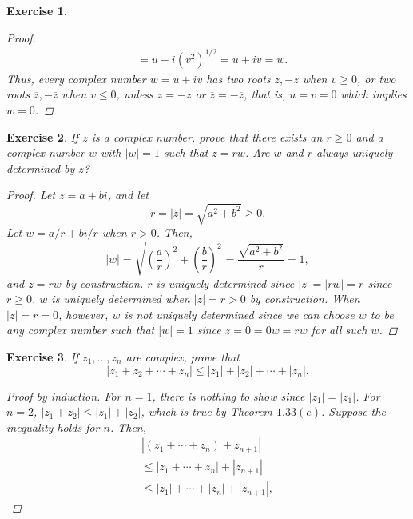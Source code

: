 \documentclass[10pt,letterpaper]{amsart}
\newtheorem{exercise}{Exercise}[section]
\theoremstyle{definition}
\theoremstyle{remark}
\numberwithin{equation}{exercise}
\begin{document}
\begin{multicols}{2}
\begin{exercise}
\begin{proof}
\begin{align*}
        &= u - i\left( v^2 \right)^{1/2} = u + iv = w.
      \end{align*}
      Thus, every complex number $w = u + iv$ has two roots $z,-z$ when $v \ge 0$, or two roots $\overline{z},-\overline{z}$ when $v \le 0$, unless $z = -z$ or $\overline{z} = -\overline{z}$, that is, $u = v = 0$ which implies $w = 0$.
    \end{proof}
  \end{exercise}
  \begin{exercise}\label{1.11}
    If $z$ is a complex number, prove that there exists an $r \ge 0$ and a complex number $w$ with $|w| = 1$ such that $z = rw$. Are $w$ and $r$ always uniquely determined by $z$?
    \begin{proof}
      Let $z = a + bi$, and let
      \begin{equation*}
        r = |z| = \sqrt{a^2 + b^2} \ge 0.
      \end{equation*}
      Let $w = a/r + bi/r$ when $r > 0$. Then,
      \begin{equation*}
        |w| = \sqrt{\left(\frac{a}{r}\right)^2+\left(\frac{b}{r}\right)^2} = \frac{\sqrt{a^2+b^2}}{r} = 1,
      \end{equation*}
      and $z = rw$ by construction. $r$ is uniquely determined since $|z| = |rw| = r$ since $r \ge 0$. $w$ is uniquely determined when $|z| = r > 0$ by construction. When $|z| = r = 0$, however, $w$ is not uniquely determined since we can choose $w$ to be any complex number such that $|w| = 1$ since $z = 0 = 0w = rw$ for all such $w$.
    \end{proof}
  \end{exercise}
  \begin{exercise}\label{1.12}
    If $z_1,\ldots,z_n$ are complex, prove that
    \begin{equation*}
      |z_1 + z_2 + \cdots + z_n| \le |z_1| + |z_2| + \cdots + |z_n|.
    \end{equation*}
    \begin{proof}[Proof by induction]
      For $n = 1$, there is nothing to show since $|z_1| = |z_1|$. For $n = 2$, $|z_1 + z_2| \le |z_1| + |z_2|$, which is true by Theorem $1.33(e)$. Suppose the inequality holds for $n$. Then,
      \begin{multline*}
        |(z_1 + \cdots + z_n) + z_{n+1}|\\
        \le |z_1 + \cdots + z_n| + |z_{n+1}|\\
        \le |z_1| + \cdots + |z_n| + |z_{n+1}|,
      \end{multline*}

\end{proof}
\end{exercise}
\end{multicols}
\end{document}

